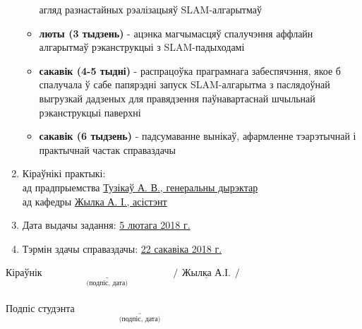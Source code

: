 \documentclass[12pt,a4paper]{extarticle}
\begin{document}
\begin{enumerate}
\begin{itemize}
				агляд разнастайных рэалізацыяў SLAM-алгарытмаў
				\item \textbf{люты (3 тыдзень)} - ацэнка магчымасцяў спалучэння аффлайн алгарытмаў рэканструкцыі
				з SLAM-падыходамі
				\item \textbf{сакавік (4-5 тыдні)} - распрацоўка праграмнага забеспячэння, якое б спалучала ў сабе
				папярэдні запуск SLAM-алгарытма з паслядоўнай выгрузкай дадзеных для правядзення
				паўнавартаснай шчыльнай рэканструкцыі паверхні
				\item \textbf{сакавік (6 тыдзень)} - падсумаванне вынікаў,
				афармленне тэарэтычнай і практычнай частак справаздачы
			\end{itemize}
		\item Кіраўнікі практыкі: \\
		ад прадпрыемства \underline{Тузікаў А. В., генеральны дырэктар} \\
		ад кафедры \underline{Жылка А. І., асістэнт} \\
		\item Дата выдачы задання: \underline{5 лютага 2018 г.}
		\item Тэрмін здачы справаздачы: \underline{22 сакавіка 2018 г.}
	\end{enumerate}
	\vspace{30pt}
	Кіраўнік $\underset{\text{(подпіс, дата)}}{\underline{\hspace{150pt}}} \hspace{5pt}  /\underline{\hspace{5pt}\textit{Жылка А.І.}\hspace{5pt}}/$ \\
	\vspace{15pt} \\
	Подпіс студэнта $\underset{\text{(подпіс, дата)}}{\underline{\hspace{150pt}}}$
\end{document}
